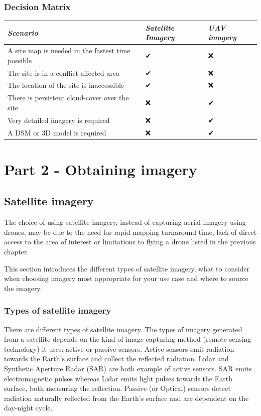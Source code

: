 \documentclass[
  a4paper,
  onecolumn,
  oneside]{book}
\begin{document}
\hypertarget{decision-matrix}{%
\section{Decision Matrix}\label{decision-matrix}}

\begin{longtable}[]{@{}lll@{}}
\toprule()
\emph{Scenario} & \emph{Satellite Imagery} & \emph{UAV imagery} \\
\midrule()
\endhead
A site map is needed in the fastest time possible & ✔ & ❌ \\
The site is in a conflict affected area & ✔ & ❌ \\
The location of the site is inaccessible & ✔ & ❌ \\
There is persistent cloud-cover over the site & ❌ & ✔ \\
Very detailed imagery is required & ❌ & ✔ \\
A DSM or 3D model is required & ❌ & ✔ \\
\bottomrule()
\end{longtable}

\part{Part 2 - Obtaining imagery}

\hypertarget{satellite-imagery}{%
\chapter{Satellite imagery}\label{satellite-imagery}}

The choice of using satellite imagery, instead of capturing aerial
imagery using drones, may be due to the need for rapid mapping
turnaround time, lack of direct access to the area of interest or
limitations to flying a drone listed in the previous chapter.

This section introduces the different types of satellite imagery, what
to consider when choosing imagery most appropriate for your use case and
where to source the imagery.

\hypertarget{types-of-satellite-imagery}{%
\section{Types of satellite imagery}\label{types-of-satellite-imagery}}

There are different types of satellite imagery. The types of imagery
generated from a satellite depends on the kind of image-capturing method
(remote sensing technology) it uses: active or passive sensors. Active
sensors emit radiation towards the Earth's surface and collect the
reflected radiation. Lidar and Synthetic Aperture Radar (SAR) are both
example of active sensors. SAR emits electromagnetic pulses whereas
Lidar emits light pulses towards the Earth surface, both measuring the
reflection. Passive (or Optical) sensors detect radiation naturally
reflected from the Earth's surface and are dependent on the day-night
cycle.
\end{document}

